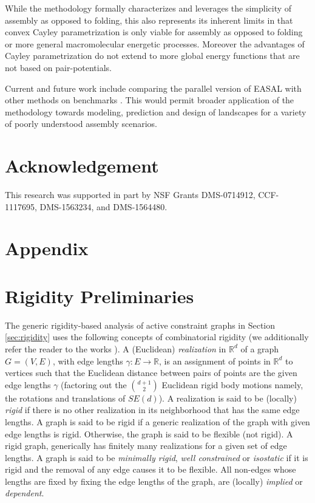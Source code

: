 \documentclass[]{article}
\begin{document}
While the methodology formally characterizes and leverages the simplicity of
assembly as opposed to folding, this also represents its inherent limits in
that convex Cayley parametrization is only viable for assembly as opposed to
folding or more general macromolecular energetic processes. Moreover the
advantages of Cayley parametrization do not extend to more global energy
functions that are not based on pair-potentials.

Current and future work include comparing the parallel version of EASAL with
other methods \cite{Griffiths2019} on benchmarks
\cite{Chill2014,cha2015accelerated}. This would permit broader application of
the methodology towards modeling, prediction and design of landscapes for a
variety of poorly understood assembly scenarios.
 
\section*{Acknowledgement}
This research was supported in part by NSF Grants
DMS-0714912, CCF-1117695, DMS-1563234, and DMS-1564480.





\section*{Appendix}
\appendix
\section{Rigidity Preliminaries}
\label{sec:app:rigidity}
The generic rigidity-based analysis of active constraint graphs in Section
\ref{sec:rigidity} uses the following concepts of combinatorial
rigidity (we additionally refer the reader to the works
\cite{SJS:Handbook,CombinatorialRigidity}).  A (Euclidean)
\emph{realization} in $\mathbb{R}^d$ of a graph $G = (V, E)$, with edge
lengths $\gamma: E \rightarrow \mathbb{R}$, is an assignment of points
in $\mathbb{R}^d$ to vertices such that the Euclidean distance between
pairs of points are the given edge lengths $\gamma$ (factoring out the
$d+1 \choose 2$ Euclidean rigid body motions namely, the rotations and
translations of $SE(d)$). A realization is said to be (locally)
\emph{rigid} if there is no other realization in its neighborhood that
has the same edge lengths. A graph is said to be rigid if a generic
realization of the graph with given edge lengths is rigid. Otherwise,
the graph is said to be flexible (not rigid).  A rigid graph,
generically has finitely many realizations for a given set of edge
lengths. A graph is said to be \emph{minimally rigid}, \emph{well
constrained} or \emph{isostatic} if it is rigid and the removal of any
edge causes it to be flexible.  All non-edges whose lengths are fixed by
fixing the edge lengths of the graph, are 
(locally) \emph{implied} or
\emph{dependent}. 
\end{document}
